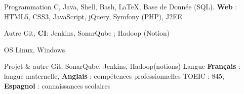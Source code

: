 

\begin{cvskills}

	\cvskill
		{Programmation} %
		{C, Java, Shell, Bash, \LaTeX, Base de Donnée (SQL). \textbf{Web} : HTML5, CSS3, JavaScript, jQuery, Symfony (PHP), J2EE }

	\cvskill
		{Autre} %
		{Git, \textbf{CI}: Jenkins, SonarQube ; Hadoop (Notion)} %


	\cvskill
		{OS} %
		{Linux, Windows} %

	\cvskill
	    {Projet \& autre} %
	    {Git, SonarQube, Jenkins, Hadoop(notions)} %
  \cvskill
    {Langue} %
	    {\textbf{Français} : langue maternelle, \textbf{Anglais}  : compétences professionnelles TOEIC : 845, \textbf{Espagnol} : connaissances scolaires} %

\end{cvskills}
